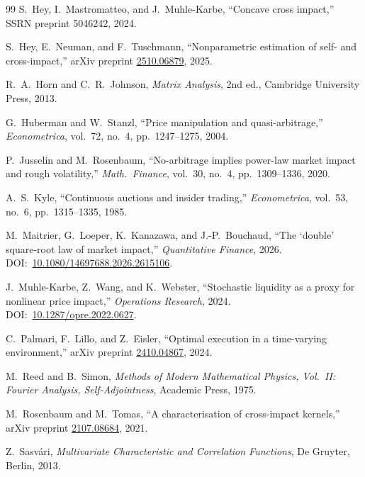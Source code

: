 \documentclass[12pt]{article}
\theoremstyle{definition}
\theoremstyle{remark}
\begin{document}
\begin{thebibliography}{99}
S.~Hey, I.~Mastromatteo, and J.~Muhle-Karbe,
``Concave cross impact,''
SSRN preprint 5046242, 2024.

S.~Hey, E.~Neuman, and F.~Tuschmann,
``Nonparametric estimation of self- and cross-impact,''
arXiv preprint \href{https://arxiv.org/abs/2510.06879}{2510.06879}, 2025.

R.~A.~Horn and C.~R.~Johnson,
\emph{Matrix Analysis}, 2nd ed.,
Cambridge University Press, 2013.

G.~Huberman and W.~Stanzl,
``Price manipulation and quasi-arbitrage,''
\emph{Econometrica}, vol.~72, no.~4, pp.~1247--1275, 2004.

P.~Jusselin and M.~Rosenbaum,
``No-arbitrage implies power-law market impact and rough volatility,''
\emph{Math.\ Finance}, vol.~30, no.~4, pp.~1309--1336, 2020.

A.~S.~Kyle,
``Continuous auctions and insider trading,''
\emph{Econometrica}, vol.~53, no.~6, pp.~1315--1335, 1985.

M.~Maitrier, G.~Loeper, K.~Kanazawa, and J.-P.~Bouchaud,
``The `double' square-root law of market impact,''
\emph{Quantitative Finance}, 2026.
DOI:~\href{https://doi.org/10.1080/14697688.2026.2615106}{10.1080/14697688.2026.2615106}.

J.~Muhle-Karbe, Z.~Wang, and K.~Webster,
``Stochastic liquidity as a proxy for nonlinear price impact,''
\emph{Operations Research}, 2024.
DOI:~\href{https://doi.org/10.1287/opre.2022.0627}{10.1287/opre.2022.0627}.

C.~Palmari, F.~Lillo, and Z.~Eisler,
``Optimal execution in a time-varying environment,''
arXiv preprint \href{https://arxiv.org/abs/2410.04867}{2410.04867}, 2024.

M.~Reed and B.~Simon,
\emph{Methods of Modern Mathematical Physics, Vol.~II: Fourier Analysis, Self-Adjointness},
Academic Press, 1975.

M.~Rosenbaum and M.~Tomas,
``A characterisation of cross-impact kernels,''
arXiv preprint \href{https://arxiv.org/abs/2107.08684}{2107.08684}, 2021.

Z.~Sasv\'ari,
\emph{Multivariate Characteristic and Correlation Functions},
De Gruyter, Berlin, 2013.


\end{thebibliography}
\end{document}
